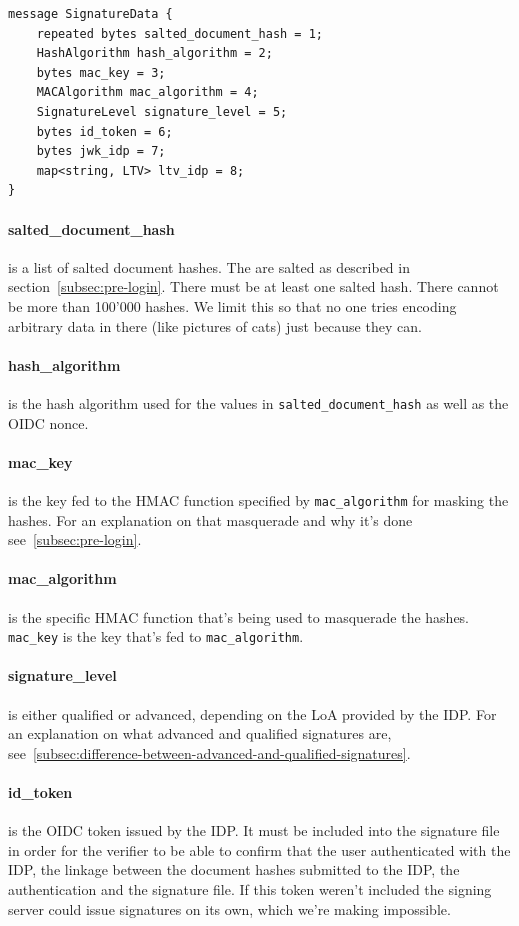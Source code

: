 \begin{lstlisting}[caption={SignatureData schema}, captionpos=b, label={lst:signaturedataschema}]
message SignatureData {
    repeated bytes salted_document_hash = 1;
    HashAlgorithm hash_algorithm = 2;
    bytes mac_key = 3;
    MACAlgorithm mac_algorithm = 4;
    SignatureLevel signature_level = 5;
    bytes id_token = 6;
    bytes jwk_idp = 7;
    map<string, LTV> ltv_idp = 8;
}
\end{lstlisting}

\paragraph{salted\_document\_hash} is a list of salted document hashes.
The are salted as described in section~\ref{subsec:pre-login}.
There must be at least one salted hash.
There cannot be more than 100'000 hashes.
We limit this so that no one tries encoding arbitrary data in there (like pictures of cats) just because they can.

\paragraph{hash\_algorithm} is the hash algorithm used for the values in \texttt{salted\_document\_hash} as well as the \gls{OIDC} nonce.
\paragraph{mac\_key} is the key fed to the \gls{HMAC} function specified by \texttt{mac\_algorithm} for masking the hashes.
For an explanation on that masquerade and why it's done see~\ref{subsec:pre-login}.
\paragraph{mac\_algorithm} is the specific \gls{HMAC} function that's being used to masquerade the hashes.
\texttt{mac\_key} is the key that's fed to \texttt{mac\_algorithm}.
\paragraph{signature\_level} is either qualified or advanced, depending on the \gls{LoA} provided by the \gls{IDP}.
For an explanation on what advanced and qualified signatures are, see~\ref{subsec:difference-between-advanced-and-qualified-signatures}.
\paragraph{id\_token} is the \gls{OIDC} token issued by the \gls{IDP}.
It must be included into the signature file in order for the verifier to be able to confirm that the user authenticated with the \gls{IDP},
the linkage between the document hashes submitted to the \gls{IDP}, the authentication and the signature file.
If this token weren't included the signing server could issue signatures on its own, which we're making impossible.
